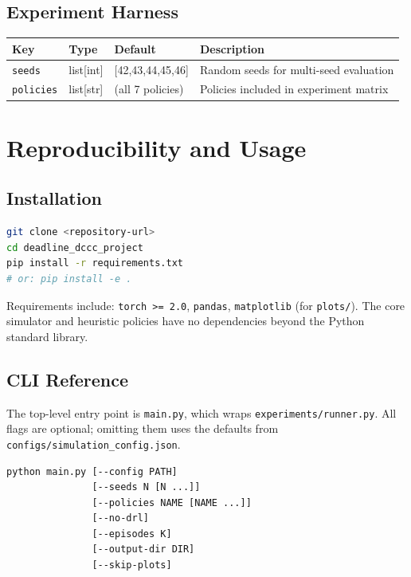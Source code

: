 \documentclass[12pt]{article}
\begin{document}
\subsection{Experiment Harness}

\begin{tabularx}{\linewidth}{@{}l l l X@{}}
\toprule
\textbf{Key} & \textbf{Type} & \textbf{Default} & \textbf{Description} \\
\midrule
\texttt{seeds} & list[int] & [42,43,44,45,46] & Random seeds for multi-seed evaluation \\
\texttt{policies} & list[str] & (all 7 policies) & Policies included in experiment matrix \\
\bottomrule
\end{tabularx}

\section{Reproducibility and Usage}
\label{sec:repro}

\subsection{Installation}

\begin{lstlisting}[style=shellstyle, language=bash]
git clone <repository-url>
cd deadline_dccc_project
pip install -r requirements.txt
# or: pip install -e .
\end{lstlisting}

Requirements include: \texttt{torch >= 2.0}, \texttt{pandas}, \texttt{matplotlib} (for \texttt{plots/}). The core simulator and heuristic policies have no dependencies beyond the Python standard library.

\subsection{CLI Reference}

The top-level entry point is \texttt{main.py}, which wraps \texttt{experiments/runner.py}. All flags are optional; omitting them uses the defaults from \texttt{configs/simulation\_config.json}.

\begin{lstlisting}[style=shellstyle, language=bash]
python main.py [--config PATH]
               [--seeds N [N ...]]
               [--policies NAME [NAME ...]]
               [--no-drl]
               [--episodes K]
               [--output-dir DIR]
               [--skip-plots]
\end{lstlisting}
\end{document}
